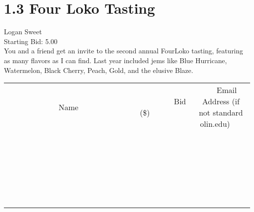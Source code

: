 \documentclass[11pt]{article}
\begin{document}
					\section*{1.3 Four Loko Tasting}
					Logan Sweet \\
					Starting Bid: 5.00 \\
					You and a friend get an invite to the second annual FourLoko tasting, featuring as many flavors as I can find. Last year included jems like Blue Hurricane, Watermelon, Black Cherry, Peach, Gold, and the elusive Blaze. \\
					[6ex]
					\begin{tabular}{c c c}
						~~~~~~~~~~~~~Name~~~~~~~~~~~~~ & ~~~~~~~~~Bid (\$)~~~~~~~~~ & ~~~Email Address (if not standard olin.edu)~~~ \\
				
 & & \\
\hline
 & & \\
\hline
 & & \\
\hline
 & & \\
\hline
 & & \\
\hline
 & & \\
\hline
 & & \\
\hline
 & & \\
\hline
 & & \\
\hline
 & & \\
\hline
 & & \\
\hline
 & & \\
\hline
 & & \\
\hline
 & & \\
\hline
 & & \\
\hline
 & & \\
\hline
 & & \\
\hline
 & & \\
\hline
 & & \\
\hline
 & & \\
\hline
 & & \\
\hline
 & & \\
\hline
 & & \\
\hline
 & & \\
\hline
 & & \\
\hline
 & & \\
\hline
					\end{tabular}
					\clearpage
				
\end{document}
